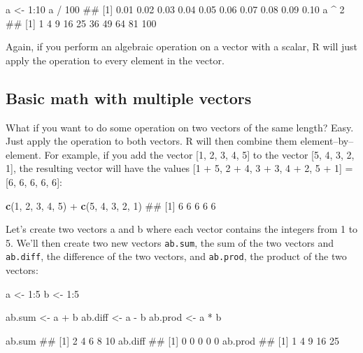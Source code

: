 \documentclass[]{book}
\newenvironment{Shaded}{\begin{snugshade}}{\end{snugshade}}
\newcommand{\KeywordTok}[1]{\textcolor[rgb]{0.13,0.29,0.53}{\textbf{{#1}}}}
\newcommand{\DecValTok}[1]{\textcolor[rgb]{0.00,0.00,0.81}{{#1}}}
\newcommand{\StringTok}[1]{\textcolor[rgb]{0.31,0.60,0.02}{{#1}}}
\newcommand{\NormalTok}[1]{{#1}}
\theoremstyle{definition}
\theoremstyle{definition}
\theoremstyle{remark}
\begin{document}
\begin{Shaded}
\begin{Highlighting}[]
\NormalTok{a <-}\StringTok{ }\DecValTok{1}\NormalTok{:}\DecValTok{10}
\NormalTok{a /}\StringTok{ }\DecValTok{100}
\NormalTok{##  [1] 0.01 0.02 0.03 0.04 0.05 0.06 0.07 0.08 0.09 0.10}
\NormalTok{a ^}\StringTok{ }\DecValTok{2}
\NormalTok{##  [1]   1   4   9  16  25  36  49  64  81 100}
\end{Highlighting}
\end{Shaded}

Again, if you perform an algebraic operation on a vector with a scalar,
R will just apply the operation to every element in the vector.

\subsection{Basic math with multiple
vectors}\label{basic-math-with-multiple-vectors}

What if you want to do some operation on two vectors of the same length?
Easy. Just apply the operation to both vectors. R will then combine them
element--by--element. For example, if you add the vector {[}1, 2, 3, 4,
5{]} to the vector {[}5, 4, 3, 2, 1{]}, the resulting vector will have
the values {[}1 + 5, 2 + 4, 3 + 3, 4 + 2, 5 + 1{]} = {[}6, 6, 6, 6,
6{]}:

\begin{Shaded}
\begin{Highlighting}[]
\KeywordTok{c}\NormalTok{(}\DecValTok{1}\NormalTok{, }\DecValTok{2}\NormalTok{, }\DecValTok{3}\NormalTok{, }\DecValTok{4}\NormalTok{, }\DecValTok{5}\NormalTok{) +}\StringTok{ }\KeywordTok{c}\NormalTok{(}\DecValTok{5}\NormalTok{, }\DecValTok{4}\NormalTok{, }\DecValTok{3}\NormalTok{, }\DecValTok{2}\NormalTok{, }\DecValTok{1}\NormalTok{)}
\NormalTok{## [1] 6 6 6 6 6}
\end{Highlighting}
\end{Shaded}

Let's create two vectors a and b where each vector contains the integers
from 1 to 5. We'll then create two new vectors \texttt{ab.sum}, the sum
of the two vectors and \texttt{ab.diff}, the difference of the two
vectors, and \texttt{ab.prod}, the product of the two vectors:

\begin{Shaded}
\begin{Highlighting}[]
\NormalTok{a <-}\StringTok{ }\DecValTok{1}\NormalTok{:}\DecValTok{5}
\NormalTok{b <-}\StringTok{ }\DecValTok{1}\NormalTok{:}\DecValTok{5}

\NormalTok{ab.sum <-}\StringTok{ }\NormalTok{a +}\StringTok{ }\NormalTok{b}
\NormalTok{ab.diff <-}\StringTok{ }\NormalTok{a -}\StringTok{ }\NormalTok{b}
\NormalTok{ab.prod <-}\StringTok{ }\NormalTok{a *}\StringTok{ }\NormalTok{b}

\NormalTok{ab.sum}
\NormalTok{## [1]  2  4  6  8 10}
\NormalTok{ab.diff}
\NormalTok{## [1] 0 0 0 0 0}
\NormalTok{ab.prod}
\NormalTok{## [1]  1  4  9 16 25}
\end{Highlighting}
\end{Shaded}
\end{document}

